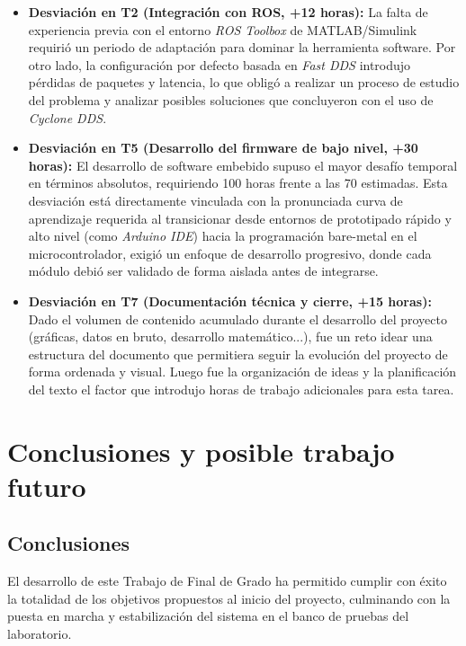 \documentclass[11pt,fleqn]{book} %
\begin{document}
\begin{itemize}
	\item \textbf{Desviación en T2 (Integración con ROS, +12 horas):} La falta de experiencia previa con el entorno \textit{ROS Toolbox} de MATLAB/Simulink requirió un periodo de adaptación para dominar la herramienta software. Por otro lado, la configuración por defecto basada en \textit{Fast DDS} introdujo pérdidas de paquetes y latencia, lo que obligó a realizar un proceso de estudio del problema y analizar posibles soluciones que concluyeron con el uso de  \textit{Cyclone DDS}. 
	
	\item \textbf{Desviación en T5 (Desarrollo del firmware de bajo nivel, +30 horas):} El desarrollo de software embebido supuso el mayor desafío temporal en términos absolutos, requiriendo 100 horas frente a las 70 estimadas. Esta desviación está directamente vinculada con la pronunciada curva de aprendizaje requerida al transicionar desde entornos de prototipado rápido y alto nivel (como \textit{Arduino IDE}) hacia la programación bare-metal en el microcontrolador, exigió un enfoque de desarrollo progresivo, donde cada módulo debió ser validado de forma aislada antes de integrarse.
	
	\item \textbf{Desviación en T7 (Documentación técnica y cierre, +15 horas):} Dado el volumen de contenido acumulado durante el desarrollo del proyecto (gráficas, datos en bruto, desarrollo matemático...), fue un reto idear una estructura del documento que permitiera seguir la evolución del proyecto de forma ordenada y visual. Luego fue la organización de ideas y la planificación del texto el factor que introdujo horas de trabajo adicionales para esta tarea.
\end{itemize}

\chapter{Conclusiones y posible trabajo futuro}

\section{Conclusiones}
El desarrollo de este Trabajo de Final de Grado ha permitido cumplir con éxito la totalidad de los objetivos propuestos al inicio del proyecto, culminando con la puesta en marcha y estabilización del sistema en el banco de pruebas del laboratorio. 
\end{document}
